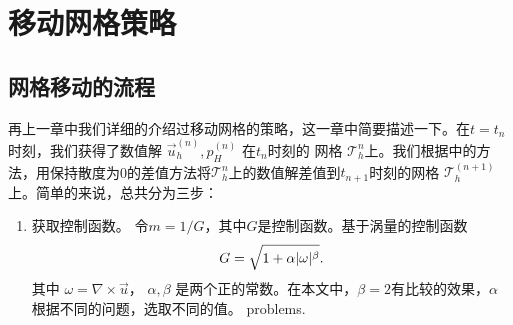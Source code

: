 \section{移动网格策略}
  \subsection{网格移动的流程}
     再上一章中我们详细的介绍过移动网格的策略，这一章中简要描述一下。在$t = t_{n}$时刻，我们获得了数值解 $\vec{u}_h^{(n)}, p_H^{(n)}$ 在$t_n$时刻的
     网格 $\mathcal{T}_h^n$上。我们根据\cite{di2005moving}中的方法，用保持散度为0的差值方法将$\mathcal{T}_h^n$上的数值解差值到$t_{n + 1}$时刻的网格
     $\mathcal{T}_h^{(n + 1)}$上。简单的来说，总共分为三步：
     \begin{enumerate}[step 1]
     \item 获取控制函数。 令$m = 1/G$，其中$G$是控制函数。基于涡量的控制函数
       \begin{equation}
         \centering
         G = \sqrt{1 + \alpha |\omega|^\beta}.
         \label{eq::monitor_vorticity}
       \end{equation}
       其中 $\omega = \nabla \times \vec{u}$， $\alpha, \beta$
       是两个正的常数。在本文中，$\beta = 2$有比较的效果，$\alpha$ 根据不同的问题，选取不同的值。
       problems.


\end{enumerate}
